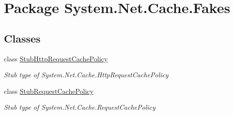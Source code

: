 \hypertarget{namespace_system_1_1_net_1_1_cache_1_1_fakes}{\section{Package System.\-Net.\-Cache.\-Fakes}
\label{namespace_system_1_1_net_1_1_cache_1_1_fakes}
}
\subsection*{Classes}
\begin{DoxyCompactItemize}
\item 
class \hyperlink{class_system_1_1_net_1_1_cache_1_1_fakes_1_1_stub_http_request_cache_policy}{Stub\-Http\-Request\-Cache\-Policy}
\begin{DoxyCompactList}\small\item\em Stub type of System.\-Net.\-Cache.\-Http\-Request\-Cache\-Policy\end{DoxyCompactList}\item 
class \hyperlink{class_system_1_1_net_1_1_cache_1_1_fakes_1_1_stub_request_cache_policy}{Stub\-Request\-Cache\-Policy}
\begin{DoxyCompactList}\small\item\em Stub type of System.\-Net.\-Cache.\-Request\-Cache\-Policy\end{DoxyCompactList}\end{DoxyCompactItemize}
